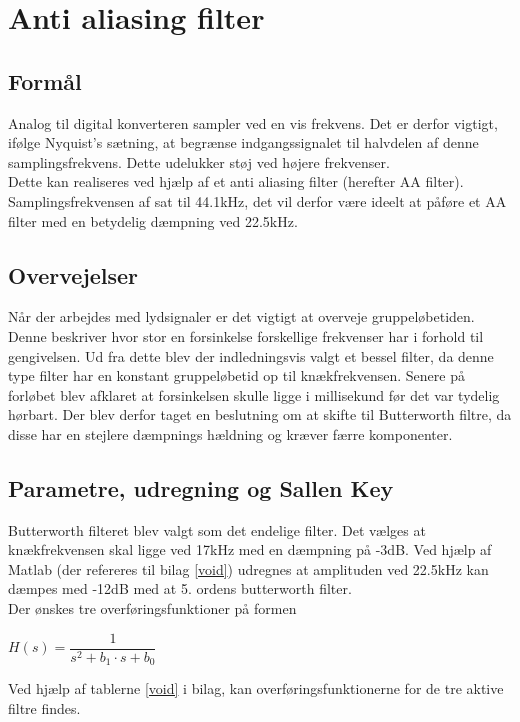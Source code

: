 \section{Anti aliasing filter}
\subsection{Formål}
Analog til digital konverteren sampler ved en vis frekvens. Det er derfor vigtigt, ifølge Nyquist’s sætning, at begrænse indgangssignalet til halvdelen af denne samplingsfrekvens. Dette udelukker støj ved højere frekvenser.\\

Dette kan realiseres ved hjælp af et anti aliasing filter (herefter AA filter). Samplingsfrekvensen af sat til 44.1kHz, det vil derfor være ideelt at påføre et AA filter med en betydelig dæmpning ved 22.5kHz.\\
\subsection{Overvejelser}
Når der arbejdes med lydsignaler er det vigtigt at overveje gruppeløbetiden. Denne beskriver hvor stor en forsinkelse forskellige frekvenser har i forhold til gengivelsen. Ud fra dette blev der indledningsvis valgt et bessel filter, da denne type filter har en konstant gruppeløbetid op til knækfrekvensen. Senere på forløbet blev afklaret at forsinkelsen skulle ligge i millisekund før det var tydelig hørbart. Der blev derfor taget en beslutning om at skifte til Butterworth filtre, da disse har en stejlere dæmpnings hældning og kræver færre komponenter.\\
\subsection{Parametre, udregning og Sallen Key}
Butterworth filteret blev valgt som det endelige filter. 
Det vælges at knækfrekvensen skal ligge ved 17kHz med en dæmpning på -3dB. Ved hjælp af Matlab (der refereres til bilag \ref{void}) udregnes at amplituden ved 22.5kHz kan dæmpes med -12dB med at 5. ordens butterworth filter.\\
Der ønskes tre overføringsfunktioner på formen\\
\begin{center}
	$H(s) = \dfrac{1}{s^2+b_1\cdot s + b_0}$\\
\end{center}
Ved hjælp af tablerne \ref{void} i bilag, kan overføringsfunktionerne for de tre aktive filtre findes.

